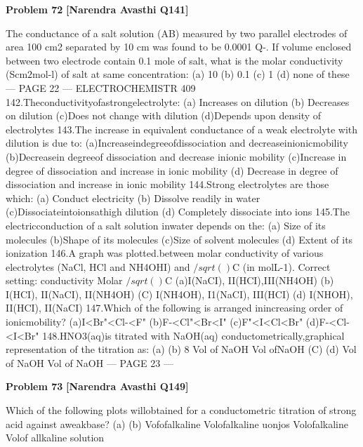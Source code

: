 \begin{problembox}
\textbf{Problem 72} \hfill \textbf{[Narendra Avasthi Q141]}
\label{q:ext-narendra_avasthi_all_questions-72}

The conductance of a salt solution (AB) measured by two parallel electrodes of area 100 cm2
separated by 10 cm was found to be 0.0001 Q-. If volume enclosed between two electrode
contain 0.1 mole of salt, what is the molar conductivity (Scm$2$mol-l) of salt at same
concentration:
(a) 10
(b) 0.1
(c) 1
(d) none of these
--- PAGE 22 ---
ELECTROCHEMISTR
409
142.Theconductivityofastrongelectrolyte: 
(a) Increases on dilution
(b) Decreases on dilution
(c)Does not change with dilution
(d)Depends upon density of electrolytes
143.The increase in equivalent conductance of a weak electrolyte with dilution is due to:
(a)Increaseindegreeofdissociation and decreaseinionicmobility
(b)Decreasein degreeof dissociation and decrease inionic mobility
(c)Increase in degree of dissociation and increase in ionic mobility
(d) Decrease in degree of dissociation and increase in ionic mobility
144.Strong electrolytes are those which:
(a) Conduct electricity
(b) Dissolve readily in water
(c)Dissociateintoionsathigh dilution
(d) Completely dissociate into ions
145.The electricconduction of a salt solution inwater depends on the:
(a) Size of its molecules
(b)Shape of its molecules
(c)Size of solvent molecules
(d) Extent of its ionization
146.A graph was plotted.between molar conductivity of various electrolytes (NaCl, HCl and
NH4OHI) and $/sqrt()$C (in molL-1). Correct setting:
conductivity
Molar
$/sqrt()$C
(a)I(NaCI), II(HCI),III(NH4OH)
(b) I(HCI), II(NaCI), II(NH4OH)
(C) I(NH4OH), I1(NaCI), III(HCI)
(d) I(NHOH), II(HCI), II(NaCI)
147.Which of the following is arranged inincreasing order of ionicmobility?
(a)I<Br"<Cl-<F"
(b)F-<Cl"<Br<I"
(c)F"<I<Cl<Br"
(d)F-<Cl-<I<Br"
148.HNO3(aq)is titrated with NaOH(aq) conductometrically,graphical representation of the
titration as:
(a)
(b)
8
Vol of NaOH
Vol ofNaOH
(C)
(d)
Vol of NaOH
Vol of NaOH
--- PAGE 23 ---
\end{problembox}

\begin{problembox}
\textbf{Problem 73} \hfill \textbf{[Narendra Avasthi Q149]}
\label{q:ext-narendra_avasthi_all_questions-73}

Which of the following plots willobtained for a conductometric titration of strong acid against
aweakbase?
(a)
(b)
Vofofalkaline
Volofalkaline
uonjos
Volofalkaline
Volof allkaline
solution
\end{problembox}

